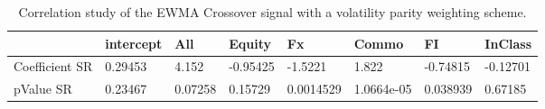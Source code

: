 \begin{table}[H]
\centering
\begin{tabular}{llllllll}
& intercept & All & Equity & Fx & Commo & FI & InClass \\ 
\hline 
Coefficient SR & 0.29453 & 4.152 & -0.95425 & -1.5221 & 1.822 & -0.74815 & -0.12701 \\ 
pValue SR & 0.23467 & 0.07258 & 0.15729 & 0.0014529 & 1.0664e-05 & 0.038939 & 0.67185 \\ 
\hline
\end{tabular}
\caption{Correlation study of the EWMA Crossover signal with a volatility parity weighting scheme.}
\label{MBBSVPOQ_CORR}
\end{table}